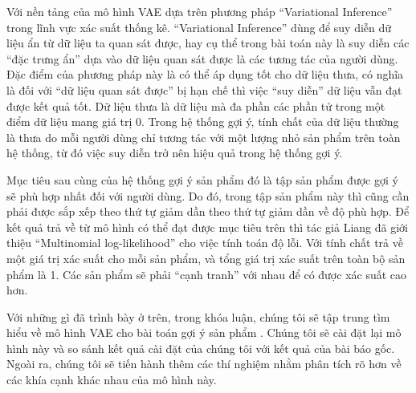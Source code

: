 Với nền tảng của mô hình VAE dựa trên phương pháp ``Variational Inference'' trong lĩnh vực xác suất thống kê. 
``Variational Inference'' dùng để suy diễn dữ liệu ẩn từ dữ liệu ta quan sát được, hay cụ thể trong bài toán này là suy diễn các ``đặc trưng ẩn'' dựa vào dữ liệu quan sát được là các tương tác của người dùng. 
Đặc điểm của phương pháp này là có thể áp dụng tốt cho dữ liệu thưa, có nghĩa là đối với ``dữ liệu quan sát được'' bị hạn chế thì việc ``suy diễn'' dữ liệu vẫn đạt được kết quả tốt. 
Dữ liệu thưa là dữ liệu mà đa phần các phần tử trong một điểm dữ liệu mang giá trị 0.
Trong hệ thống gợi ý, tính chất của dữ liệu thường là thưa do mỗi người dùng chỉ tương tác với một lượng nhỏ sản phẩm trên toàn hệ thống, từ đó việc suy diễn trở nên hiệu quả trong hệ thống gợi ý.

Mục tiêu sau cùng của hệ thống gợi ý sản phẩm đó là tập sản phẩm được gợi ý sẽ phù hợp nhất đối với người dùng. 
Do đó, trong tập sản phẩm này thì cũng cần phải được sắp xếp theo thứ tự giảm dần theo thứ tự giảm dần về độ phù hợp.
Để kết quả trả về từ mô hình có thể đạt được mục tiêu trên thì tác giả Liang đã giới thiệu ``Multinomial log-likelihood'' cho việc tính toán độ lỗi. 
Với tính chất trả về một giá trị xác suất cho mỗi sản phẩm, và tổng giá trị xác suất trên toàn bộ sản phẩm là 1. 
Các sản phẩm sẽ phải ``cạnh tranh'' với nhau để có được xác suất cao hơn.

Với những gì đã trình bày ở trên, trong khóa luận, chúng tôi sẽ tập trung tìm hiểu về mô hình VAE cho bài toán gợi ý sản phẩm \cite{mvae}. 
Chúng tôi sẽ cài đặt lại mô hình này và so sánh kết quả cài đặt của chúng tôi với kết quả của bài báo gốc.
Ngoài ra, chúng tôi sẽ tiến hành thêm các thí nghiệm nhằm phân tích rõ hơn về các khía cạnh khác nhau của mô hình này.



